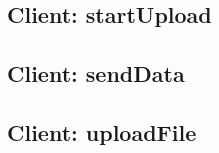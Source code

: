 \documentclass[11pt]{beamer}
\begin{document}
	\subsection*{Client: startUpload}
	
		\begin{frame}
			
		\end{frame}

	\subsection*{Client: sendData}
	
		\begin{frame}
			
		\end{frame}

	\subsection*{Client: uploadFile}
	
		\begin{frame}
			
		\end{frame}

		\begin{frame}
			
		\end{frame}
\end{document}
